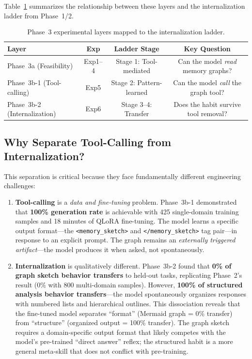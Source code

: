 \documentclass[11pt,a4paper]{article}
\begin{document}
Table~\ref{tab:layers} summarizes the relationship between these layers and the internalization ladder from Phase~1/2.

\begin{table}[h]
\centering\footnotesize
\caption{Phase~3 experimental layers mapped to the internalization ladder.}
\label{tab:layers}
\begin{tabular}{@{}lccc@{}}
\toprule
\textbf{Layer} & \textbf{Exp} & \textbf{Ladder Stage} & \textbf{Key Question} \\
\midrule
Phase~3a (Feasibility)     & Exp1--4 & Stage 1: Tool-mediated    & Can the model \textit{read} memory graphs? \\
Phase~3b-1 (Tool-calling)  & Exp5    & Stage 2: Pattern-learned  & Can the model \textit{call} the graph tool? \\
Phase~3b-2 (Internalization)& Exp6   & Stage 3--4: Transfer      & Does the habit survive tool removal? \\
\bottomrule
\end{tabular}
\end{table}

\subsection{Why Separate Tool-Calling from Internalization?}

This separation is critical because they face fundamentally different engineering challenges:

\begin{enumerate}[nosep]
\item \textbf{Tool-calling} is a \textit{data and fine-tuning} problem. Phase~3b-1 demonstrated that \textbf{100\% generation rate} is achievable with 425 single-domain training samples and 18 minutes of QLoRA fine-tuning. The model learns a specific output format---the \texttt{<memory\_sketch>} and \texttt{</memory\_sketch>} tag pair---in response to an explicit prompt. The graph remains an \textit{externally triggered artifact}---the model produces it when asked, not spontaneously.

\item \textbf{Internalization} is qualitatively different. Phase~3b-2 found that \textbf{0\% of graph sketch behavior transfers} to held-out tasks, replicating Phase~2's result (0\% with 800 multi-domain samples). However, \textbf{100\% of structured analysis behavior transfers}---the model spontaneously organizes responses with numbered lists and hierarchical outlines. This dissociation reveals that the fine-tuned model separates ``format'' (Mermaid graph = 0\% transfer) from ``structure'' (organized output = 100\% transfer). The graph sketch requires a domain-specific output format that likely competes with the model's pre-trained ``direct answer'' reflex; the structured habit is a more general meta-skill that does not conflict with pre-training.
\end{enumerate}
\end{document}
